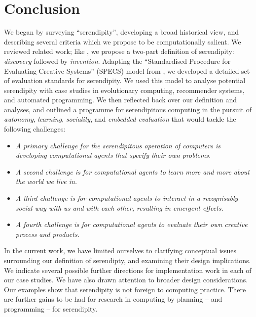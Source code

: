 \section{Conclusion} \label{sec:conclusion}

%
We began by surveying ``serendipity'', developing a broad historical
view, and describing several criteria  which we propose
to be computationally salient.  We reviewed related work; like
, we propose a two-part definition of
serendipity: \emph{discovery} followed by \emph{invention}.
%
Adapting the ``Standardised Procedure for Evaluating Creative
Systems'' (SPECS) model from , we developed a detailed set
of evaluation standards for serendipity.
%
We used this model to analyse potential serendipity with case studies in evolutionary computing, recommender systems, and automated programming.
%
We then reflected back over our definition and analyses, and outlined a programme for
serendipitous computing in the pursuit of \emph{autonomy},
\emph{learning}, \emph{sociality}, and \emph{embedded evaluation} that
would tackle the following challenges:
%
\begin{itemize}
\item \emph{A primary challenge for the serendipitous operation of
  computers is developing computational agents that specify their own
  problems.}
\item \emph{A second challenge is for computational agents to learn
  more and more about the world we live in.}
\item \emph{A third challenge is for computational agents to interact
  in a recognisably social way with us and with each other, resulting
  in emergent effects.}
\item \emph{A fourth challenge is for computational agents to evaluate
  their own creative process and products.}
\end{itemize}
%
In the current work, we have limited ourselves to clarifying
conceptual issues surrounding our definition of serendipty, and
examining their design implications.
% 
We indicate several possible further directions for implementation
work in each of our case studies.  We have also drawn attention to
broader design considerations.  Our examples show that serendipity is
not foreign to computing practice.  There are further gains to be had
for research in computing by planning -- and programming -- for
serendipity.
%

